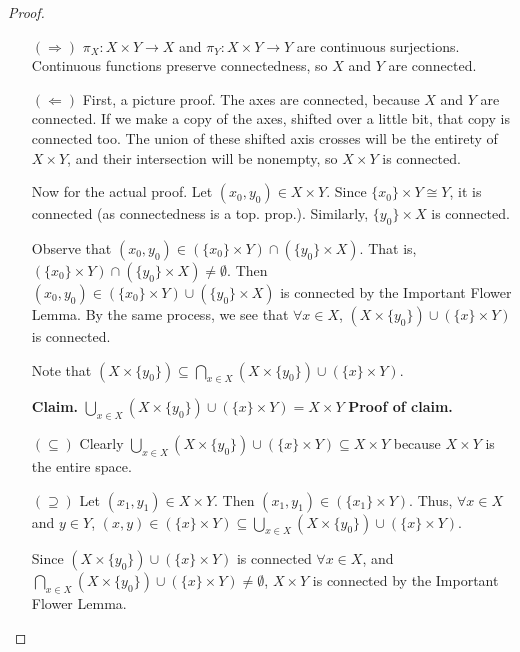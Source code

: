 \begin{proof}
	\begin{itemize}
		\item[$(\Rightarrow)$] $\pi_X: X\times Y \longrightarrow X$ and $\pi_Y: X\times Y \longrightarrow Y$ are continuous surjections. Continuous functions preserve connectedness, so $X$ and $Y$ are connected. 
		\item[$(\Leftarrow)$] First, a picture proof. \placeholder The axes are connected, because $X$ and $Y$ are connected. If we make a copy of the axes, shifted over a little bit, that copy is connected too. The union of these shifted axis crosses will be the entirety of $X\times Y$, and their intersection will be nonempty, so $X\times Y$ is connected.
		
		Now for the actual proof. Let $(x_0, y_0) \in X\times Y.$ Since $\{x_0\}\times Y \cong Y$, it is connected (as connectedness is a top. prop.). Similarly, $\{y_0\} \times X$ is connected.
		
		Observe that $(x_0, y_0) \in (\{x_0\}\times Y) \cap (\{y_0\} \times X)$. That is, $(\{x_0\}\times Y) \cap (\{y_0\} \times X) \neq \emptyset$. Then $(x_0, y_0) \in (\{x_0\}\times Y) \cup (\{y_0\} \times X)$ is connected by the Important Flower Lemma. By the same process, we see that $\forall x\in X$, $(X\times \{y_0\}) \cup (\{x\} \times Y)$ is connected.
		
		Note that $(X\times \{y_0\}) \subseteq \displaystyle{\bigcap_{x \in X}(X\times \{y_0\}) \cup (\{x\} \times Y)}$.
		
		\textbf{Claim.} $\displaystyle{\bigcup_{x \in X}(X\times \{y_0\}) \cup (\{x\} \times Y)} = X\times Y$ \textbf{Proof of claim.}
		
		$(\subseteq)$ Clearly $\displaystyle{\bigcup_{x \in X}(X\times \{y_0\}) \cup (\{x\} \times Y)} \subseteq X\times Y$ because $X\times Y$ is the entire space. 
		
		$(\supseteq)$ Let $(x_1, y_1) \in X\times Y$. Then $(x_1, y_1) \in (\{x_1\}\times Y)$. Thus, $\forall x\in X$ and $y\in Y$, $(x,y) \in (\{x\} \times Y) \subseteq {\displaystyle\bigcup_{x \in X}(X\times \{y_0\}) \cup (\{x\} \times Y)}$.
		
		Since $(X\times \{y_0\}) \cup (\{x\} \times Y)$ is connected $\forall x\in X$, and $\displaystyle{\bigcap_{x \in X}(X\times \{y_0\}) \cup (\{x\} \times Y)}\neq \emptyset$, $X\times Y$ is connected by the Important Flower Lemma. 
	\end{itemize}
\end{proof}

